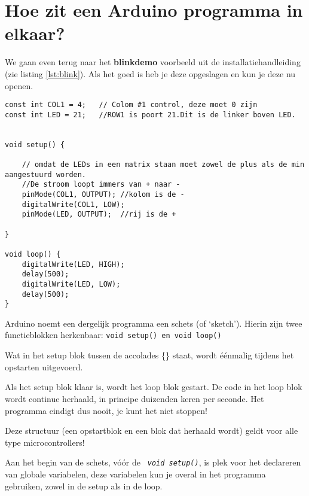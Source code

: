 \section{ Hoe zit een Arduino programma in elkaar?}\label{sec:blink}

We gaan even terug naar het \textbf{blinkdemo} voorbeeld uit de installatiehandleiding (zie listing \ref{lst:blink}).  Als het goed is heb je deze opgeslagen en kun je deze nu openen.

	


\begin{lstlisting}[caption= Het programma blinkdemo,label={lst:blink},firstnumber=1]		
const int COL1 = 4;   // Colom #1 control, deze moet 0 zijn
const int LED = 21;   //ROW1 is poort 21.Dit is de linker boven LED.


void setup() {
	
	// omdat de LEDs in een matrix staan moet zowel de plus als de min aangestuurd worden.
	//De stroom loopt immers van + naar -
	pinMode(COL1, OUTPUT); //kolom is de -
	digitalWrite(COL1, LOW);
	pinMode(LED, OUTPUT);  //rij is de +
	
}

void loop() {
	digitalWrite(LED, HIGH);
	delay(500);
	digitalWrite(LED, LOW);
	delay(500);
}
\end{lstlisting}

Arduino noemt een dergelijk programma een schets (of ‘sketch’). 
Hierin zijn twee functieblokken herkenbaar: \texttt{{\textcolor{arduinoBlue}{void}} \textcolor{arduinoGreen}{setup}(){} en  \textcolor{arduinoBlue}{void} \textcolor{arduinoGreen}{loop}(){}}

Wat in het setup blok tussen de accolades \{\} staat, wordt éénmalig tijdens het opstarten uitgevoerd.

Als het setup blok klaar is, wordt het loop blok gestart. De code in het loop blok wordt continue herhaald, in principe duizenden keren per seconde. Het programma eindigt dus nooit, je kunt het niet stoppen!

Deze structuur (een opstartblok en een blok dat herhaald wordt) geldt voor alle type microcontrollers!

Aan het begin van de schets, vóór de \texttt{\textit{ \textcolor{arduinoBlue}{void} \textcolor{arduinoGreen}{setup}()}}, is plek voor het declareren van globale variabelen, deze variabelen kun je overal in het programma gebruiken, zowel in de setup als in de loop.

